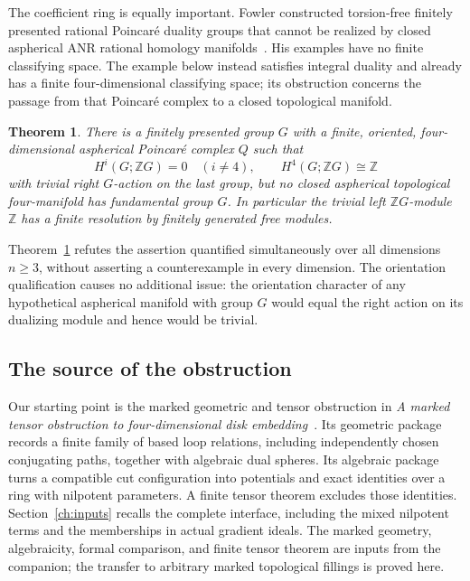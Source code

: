 \documentclass[11pt]{article}
\newtheorem{theorem}{Theorem}[section]
\theoremstyle{definition}
\theoremstyle{remark}
\newcommand{\Z}{\mathbb Z}
\begin{document}
The coefficient ring is equally important. Fowler constructed
torsion-free finitely presented rational Poincar\'e duality groups that
cannot be realized by closed aspherical ANR rational homology
manifolds~\cite[Theorem~2.1]{Fowler}. His examples have no finite
classifying space. The example below instead satisfies integral
duality and already has a finite four-dimensional classifying space;
its obstruction concerns the passage from that Poincar\'e complex to a
closed topological manifold.

\begin{theorem}\label{thm:main}
There is a finitely presented group $G$ with a finite, oriented,
four-dimensional aspherical Poincar\'e complex $Q$ such that
\[
 H^i(G;\Z G)=0\quad(i\ne4),\qquad H^4(G;\Z G)\cong\Z
\]
with trivial right $G$-action on the last group, but no closed aspherical
topological four-manifold has fundamental group $G$.
In particular the trivial left $\Z G$-module $\Z$ has a finite resolution
by finitely generated free modules.
\end{theorem}

Theorem~\ref{thm:main} refutes the assertion quantified simultaneously
over all dimensions $n\geq3$, without asserting a counterexample in every
dimension. The orientation qualification causes no additional issue:
the orientation character of any hypothetical aspherical manifold with
group $G$ would equal the right action on its dualizing module and hence
would be trivial.

\subsection{The source of the obstruction}
Our starting point is the marked geometric and tensor obstruction in
\emph{A marked tensor obstruction to four-dimensional disk
embedding}~\cite{TO}. Its geometric package records a finite family of
based loop relations, including independently chosen conjugating paths,
together with algebraic dual spheres. Its algebraic package turns a
compatible cut configuration into potentials and exact identities over
a ring with nilpotent parameters. A finite tensor theorem excludes those
identities. Section~\ref{ch:inputs} recalls the complete interface,
including the mixed nilpotent terms and the memberships in actual
gradient ideals. The marked geometry, algebraicity, formal comparison,
and finite tensor theorem are inputs from the companion; the transfer
to arbitrary marked topological fillings is proved here.
\end{document}
